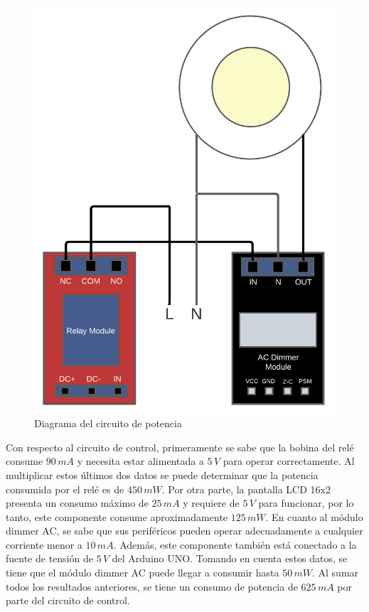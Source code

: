 \begin{figure}[H]
\centering
\includegraphics[scale=0.62]{./images/potencia.png} 
\caption{Diagrama del circuito de potencia }
\label{potencia}
\end{figure}

Con respecto al circuito de control, primeramente se sabe que la bobina del relé consume $90\,mA$ y necesita estar alimentada a $5\,V$ para operar correctamente. Al multiplicar estos últimos dos datos se puede determinar que la potencia consumida por el relé es de $450\,mW$. Por otra parte, la pantalla LCD 16x2 presenta un consumo máximo de $25\,mA$ y requiere de $5\,V$ para funcionar, por lo tanto, este componente consume aproximadamente $125\,mW$. En cuanto al módulo dimmer AC, se sabe que sus periféricos pueden operar adecuadamente a cualquier corriente menor a $10\,mA$. Además, este componente también está conectado a la fuente de tensión de $5\,V$ del Arduino UNO. Tomando en cuenta estos datos, se tiene que el módulo dimmer AC puede llegar a consumir hasta $50\,mW$. Al sumar todos los resultados anteriores, se tiene un consumo de potencia de $625\,mA$ por parte del circuito de control. 

